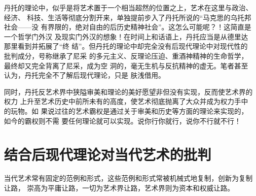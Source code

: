 丹托的理论中，似乎是将艺术置于一个相当超然的位置之上，艺术在这里与政治、经济、
科技、生活等彻底分割开来，单独提前步入了丹托所说的“马克思的乌托邦社会——没
有界限的，绝对自由的后历史精神社会”。这怎么可能呢？！这简直是一个哲学门外汉
及现实门外汉的想象！在时间上和话语上，丹托应当是从德里达那里看到并拓展了“终
结”。但丹托的理论中却完全没有后现代理论中对现代性的批判成分，号称继承了尼采
的多元主义、反理论压迫、重酒神精神的生命哲学，最终却又完全背离了尼采，成为空
洞的，毫无生机与反抗精神的虚无。笔者甚至认为，丹托完全不了解后现代理论，只是
肤浅借用。

同时，丹托反艺术界中狭隘审美和理论的美好愿望非但没有实现，反而使艺术界的权力
上升至艺术历史中前所未有的高度，使艺术彻底抛离了大众并成为权力手中的玩物。如
果说过往的艺术霸权是通过关于审美和历史等方面的理论来实现的，如今的霸权则不需
要任何理论就可以实现。说你行你就行，说你不行就不行！

\section{结合后现代理论对当代艺术的批判}

当代艺术常有固定的范例和形式，这些范例和形式常被机械式地复制，创新为复制让路，
崇高为平庸让路，一切为艺术界让路，艺术界则为资本和权威让路。

